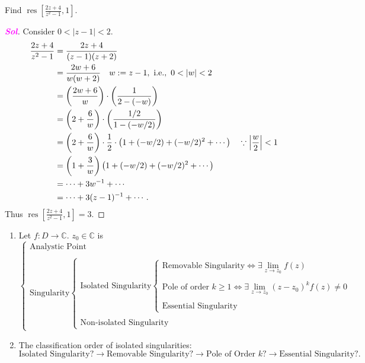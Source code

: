 \documentclass{article}
\newcommand{\ie}{\textnormal{i.e.}}
\theoremstyle{definition}
\newcommand{\C}{\mathbb{C}}
\newcommand{\of}[1]{\left( #1 \right)}
\newcommand{\abs}[1]{\left\lvert #1 \right\rvert}
\newcommand{\sol}{\textcolor{magenta}{\bf Sol}}
\newcommand{\res}{\operatorname{res}}
\begin{document}
	\begin{tcolorbox}[colback=white,colframe=white,arc=5pt,title={\color{black}\bf $\bullet$ Residue}]
		Find $\displaystyle \res\left[\frac{2z+4}{z^2-1},1\right]$. 
	\end{tcolorbox}
	\begin{proof}[\sol]
		Consider $0<\abs{z-1}<2$. \begin{align*}
		\frac{2z+4}{z^2-1}&=\frac{2z+4}{(z-1)(z+2)}\\
		&=\frac{2w+6}{w(w+2)}\quad w:=z-1,\ \ie,\ 0<\abs{w}<2 \\
		&=\of{\frac{2w+6}{w}}\cdot\of{\frac{1}{2-(-w)}}\\
		&=\of{2+\frac{6}{w}}\cdot\of{\frac{1/2}{1-(-w/2)}}\\
		&=\of{2+\frac{6}{w}}\cdot\frac{1}{2}\cdot\of{1+(-w/2)+(-w/2)^2+\cdots}\quad\because\abs{\frac{w}{2}}<1\\
		&=\of{1+\frac{3}{w}}\of{1+(-w/2)+(-w/2)^2+\cdots}\\
		&=\cdots+3w^{-1}+\cdots\\
		&=\cdots+3(z-1)^{-1}+\cdots.
		\end{align*}
		Thus $\displaystyle\res\left[\frac{2z+4}{z^2-1},1\right]=3.$
	\end{proof}
	\vspace{8pt}
	\begin{tcolorbox}[colback=white,colframe=black,arc=5pt,title={\color{white}\bf Classification of Singularities}]
		\begin{enumerate}[(1)]
			\item Let $f:D\to\C$. $z_0\in\C$ is \[
			\begin{cases}
			\text{Analystic Point}\\
			\\
			\text{Singularity}\begin{cases}
			\text{Isolated Singularity}
			\begin{cases}
			\text{Removable Singularity}\iff\exists\lim\limits_{z\to z_0} f(z)\\
			\\
			\text{Pole of order $k\geq 1$}\iff\exists\lim\limits_{z\to z_0}(z-z_0)^kf(z)\neq 0\\
			\\
			\text{Essential Singularity}
			\end{cases}
			\\
			\\
			\text{Non-isolated Singularity}
			\end{cases}
			\end{cases}
			\]
			\item The classification order of isolated singularities: \[
			\text{Isolated Singularity}?\longrightarrow\text{Removable Singularity}?\longrightarrow\text{Pole of Order $k$}?\longrightarrow\text{Essential Singularity}?.
			\]
		\end{enumerate}
	\end{tcolorbox}
\end{document}
